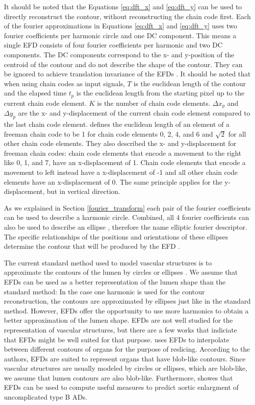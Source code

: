 \documentclass[thesis.tex]{subfiles}
\begin{document}
It should be noted that the Equations \ref{eq:dft_x} and \ref{eq:dft_y} can be used to directly reconstruct the contour, without reconstructing the chain code first. 
Each of the fourier approximations in Equations \ref{eq:dft_x} and \ref{eq:dft_y} uses two fourier coefficients per harmonic circle and one DC component. This means a single EFD consists of four fourier coefficients per harmonic and two DC components. The DC components correspond to the x- and y-position of the centroid of the contour and do not describe the shape of the contour. They can be ignored to achieve translation invariance of the EFDs \cite{giardinia}. It should be noted that when using chain codes as input signals, $T$ is the euclidean length of the contour and the elapsed time $t_p$ is the euclidean length from the starting pixel up to the current chain code element. $K$ is the number of chain code elements. $\Delta x_p$ and $\Delta y_p$ are the x- and y-displacement of the current chain code element compared to the last chain code element. \cite{giardinia} defines the euclidean length of an element of a freeman chain code to be 1 for chain code elements 0, 2, 4, and 6 and $\sqrt{2}$ for all other chain code elements. They also described the x- and y-displacement for freeman chain codes: chain code elements that encode a movement to the right like 0, 1, and 7, have an x-displacement of 1. Chain code elements that encode a movement to left instead have a x-displacement of -1 and all other chain code elements have an x-displacement of 0. The same principle applies for the y-displacement, but in vertical direction. 

As we explained in Section \ref{fourier_transform} each pair of the fourier coefficients can be used to describe a harmonic circle. Combined, all 4 fourier coefficients can also be used to describe an ellipse \cite{lin1987new,giardinia}, therefore the name elliptic fourier descriptor. The specific relationships of the positions and orientations of these ellipses determine the contour that will be produced by the EFD \cite{lin1987new}.

The current standard method used to model vascular structures is to approximate the contours of the lumen by circles or ellipses \cite{wu2011segmentation}. We assume that EFDs can be used as a better representation of the lumen shape than the standard method: In the case one harmonic is used for the contour reconstruction, the contours are approximated by ellipses just like in the standard method. However, EFDs offer the opportunity to use more harmonics to obtain a better approximation of the lumen shape. EFDs are not well studied for the representation of vascular structures, but there are a few works that indiciate that EFDs might be well suited for that purpose. \cite{jeong2007reslicing} uses EFDs to interpolate between different contours of organs for the purpose of reslicing. According to the authors, EFDs are suited to represent organs that have blob-like contours. Since vascular structures are usually modeled by circles or ellipses, which are blob-like, we assume that lumen contours are also blob-like. Furthermore, \cite{sato2017new} showes that EFDs can be used to compute useful measures to predict aortic enlargment of uncomplicated type B ADs.
     
\end{document}
